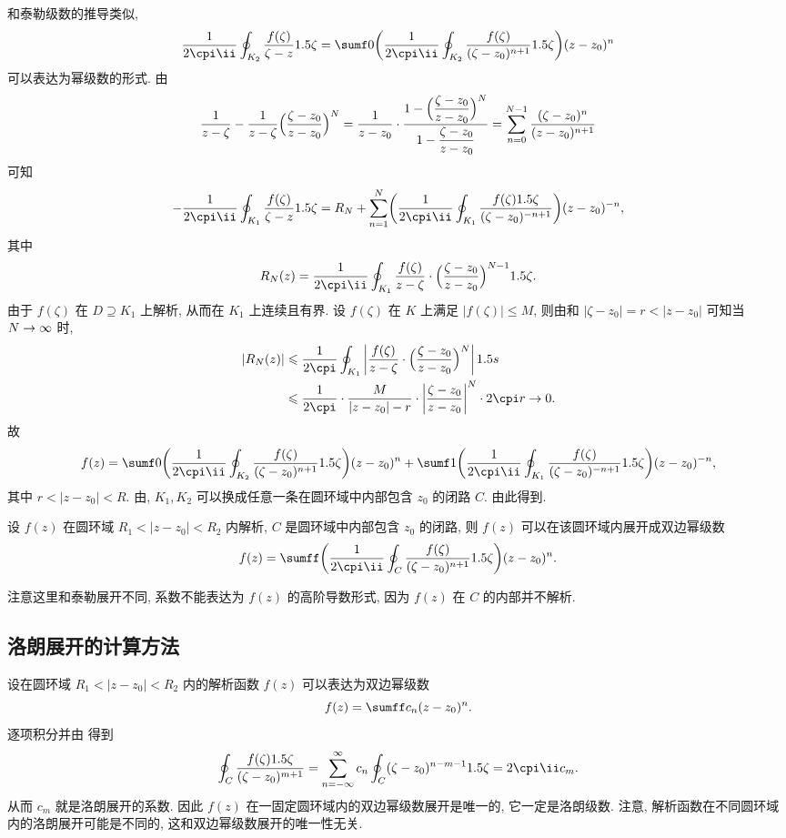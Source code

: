 和泰勒级数的推导类似,
\[
   \frac1{2\cpi\ii}\oint_{K_2}\frac{f(\zeta)}{\zeta-z}\d\zeta
  =\sumf0 \biggl(\frac1{2\cpi\ii}
    \oint_{K_2}\frac{f(\zeta)}{(\zeta-z_0)^{n+1}}\d\zeta
  \biggr)(z-z_0)^n
\]
可以表达为幂级数的形式.
由
\[
   \frac1{z-\zeta}-\frac1{z-\zeta}\Bigl(\frac{\zeta-z_0}{z-z_0}\Bigr)^N
  =\frac1{z-z_0}\cdot\frac{1-\Bigl(\dfrac{\zeta-z_0}{z-z_0}\Bigr)^N}{1-\dfrac{\zeta-z_0}{z-z_0}}
  =\sum_{n=0}^{N-1}\frac{(\zeta-z_0)^n}{(z-z_0)^{n+1}}
\]
可知
\[
  -\frac1{2\cpi\ii}\oint_{K_1}\frac{f(\zeta)}{\zeta-z}\d\zeta
  =R_N+\sum_{n=1}^N\biggl(\frac1{2\cpi\ii}\oint_{K_1}
    \frac{f(\zeta)\d\zeta}{(\zeta-z_0)^{-n+1}}
   \biggr)(z-z_0)^{-n},
\]
其中
\[
  R_N(z)=\frac1{2\cpi\ii}\oint_{K_1}\frac{f(\zeta)}{z-\zeta}\cdot\Bigl(\frac{\zeta-z_0}{z-z_0}\Bigr)^{N-1}\d\zeta.
\]
由于 $f(\zeta)$ 在 $D\supseteq K_1$ 上解析, 从而在 $K_1$ 上连续且有界.
设 $f(\zeta)$ 在 $K$ 上满足 $|f(\zeta)|\le M$, 则由\thmGrowUp 和 $|\zeta-z_0|=r<|z-z_0|$ 可知当 $N\rightarrow \infty$ 时,
\begin{align*}
  |R_N(z)|&\le\frac 1{2\cpi}\oint_{K_1}\abs{\frac{f(\zeta)}{z-\zeta}\cdot\Bigl(\frac{\zeta-z_0}{z-z_0}\Bigr)^N}\d s\\
  &\le\frac 1{2\cpi}\cdot\frac M{|z-z_0|-r}\cdot\abs{\frac{\zeta-z_0}{z-z_0}}^N\cdot 2\cpi r\ra 0.
\end{align*}
故
\[
  f(z)=
    \sumf0 \biggl(\frac1{2\cpi\ii}\oint_{K_2}\frac{f(\zeta)}{(\zeta-z_0)^{n+1}}\d\zeta\biggr)(z-z_0)^n
    +\sumf1 \biggl(\frac1{2\cpi\ii}\oint_{K_1}\frac{f(\zeta)}{(\zeta-z_0)^{-n+1}}\d\zeta\biggr)(z-z_0)^{-n},
\]
其中 $r<|z-z_0|<R$.
由\thmCCC, $K_1,K_2$ 可以换成任意一条在圆环域中内部包含 $z_0$ 的闭路 $C$.
由此得到.

\begin{theorem}
  \label{thm:laurent-expansion}
  设 $f(z)$ 在圆环域 $R_1<|z-z_0|<R_2$ 内解析, $C$ 是圆环域中内部包含 $z_0$ 的闭路, 则 $f(z)$ 可以在该圆环域内展开成双边幂级数
  \[
    f(z)=\sumff \biggl(\frac1{2\cpi\ii}\oint_C\frac{f(\zeta)}{(\zeta-z_0)^{n+1}}\d\zeta\biggr)(z-z_0)^n.
  \]
\end{theorem}

注意这里和泰勒展开不同, 系数不能表达为 $f(z)$ 的高阶导数形式, 因为 $f(z)$ 在 $C$ 的内部并不解析.


\subsection{洛朗展开的计算方法}

设在圆环域 $R_1<|z-z_0|<R_2$ 内的解析函数 $f(z)$ 可以表达为双边幂级数
\[
  f(z)=\sumff c_n(z-z_0)^n.
\]
逐项积分并由 得到
\[
   \oint_C\frac{f(\zeta)\d\zeta}{(\zeta-z_0)^{m+1}}
  =\sum_{n=-\infty}^\infty c_n\oint_C(\zeta-z_0)^{n-m-1}\d\zeta
  =2\cpi\ii c_m.
\]
从而 $c_m$ 就是洛朗展开的系数.
因此 $f(z)$ 在一固定圆环域内的\alert{双边幂级数展开是唯一的, 它一定是洛朗级数}.
注意, 解析函数在不同圆环域内的洛朗展开可能是不同的, 这和双边幂级数展开的唯一性无关.

